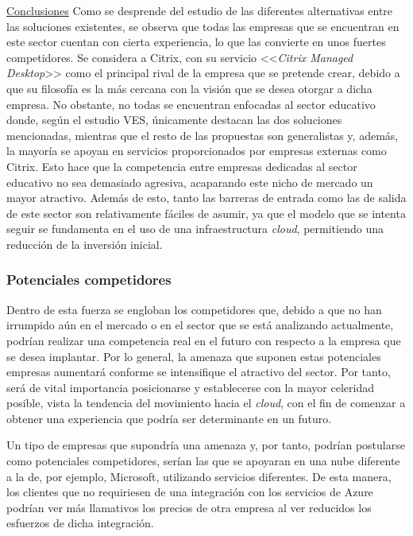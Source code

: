 \noindent\underline{Conclusiones}\newline
\indent Como se desprende del estudio de las diferentes alternativas entre las soluciones existentes, se observa que todas las empresas que se encuentran en este sector cuentan con cierta experiencia, lo que las convierte en unos fuertes competidores. Se considera a Citrix, con su servicio <<\textit{Citrix Managed Desktop}>> como el principal rival de la empresa que se pretende crear, debido a que su filosofía es la más cercana con la visión que se desea otorgar a dicha empresa. No obstante, no todas se encuentran enfocadas al sector educativo donde, según el estudio \acs{VES}, únicamente destacan las dos soluciones mencionadas, mientras que el resto de las propuestas son generalistas y, además, la mayoría se apoyan en servicios proporcionados por empresas externas como Citrix. Esto hace que la competencia entre empresas dedicadas al sector educativo no sea demasiado agresiva, acaparando este nicho de mercado un mayor atractivo. Además de esto, tanto las barreras de entrada como las de salida de este sector son relativamente fáciles de asumir, ya que el modelo que se intenta seguir se fundamenta en el uso de una infraestructura \textit{cloud}, permitiendo una reducción de la inversión inicial.

\clearpage


\subsubsection{Potenciales competidores}
Dentro de esta fuerza se engloban los competidores que, debido a que no han irrumpido aún en el mercado o en el sector que se está analizando actualmente, podrían realizar una competencia real en el futuro con respecto a la empresa que se desea implantar. Por lo general, la amenaza que suponen estas potenciales empresas aumentará conforme se intensifique el atractivo del sector. Por tanto, será de vital importancia posicionarse y establecerse con la mayor celeridad posible, vista la tendencia del movimiento hacia el \textit{cloud}, con el fin de comenzar a obtener una experiencia que podría ser determinante en un futuro.

Un tipo de empresas que supondría una amenaza y, por tanto, podrían postularse como potenciales competidores, serían las que se apoyaran en una nube diferente a la de, por ejemplo, Microsoft, utilizando servicios diferentes. De esta manera, los clientes que no requiriesen de una integración con los servicios de Azure podrían ver más llamativos los precios de otra empresa al ver reducidos los esfuerzos de dicha integración.

